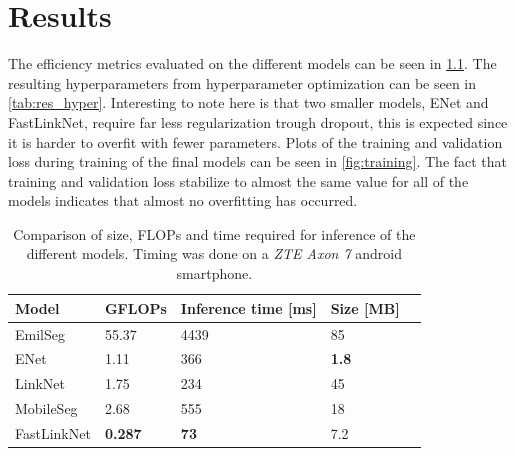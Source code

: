 \documentclass{kththesis}
\begin{document}
\chapter{Results}
The efficiency metrics evaluated on the different models can be seen in \cref{tab:res_resources}.
The resulting hyperparameters from hyperparameter optimization can be seen in
\cref{tab:res_hyper}. Interesting to note here is that two smaller models, ENet
and FastLinkNet, require far less regularization trough dropout, this is
expected since it is harder to overfit with fewer parameters.
Plots of the training and validation loss during training of the final models
can be seen in \cref{fig:training}. The fact that training and validation
loss stabilize to almost the same value for all of the models indicates that
almost no overfitting has occurred.

\begin{table}[]
\centering
\caption{Comparison of size, FLOPs and time required for inference of the
  different models. Timing was done on a \textit{ZTE Axon 7} android smartphone.}
\label{tab:res_resources}
\begin{tabular}{@{}lllll@{}}
\toprule
Model       &  GFLOPs  & Inference time {[}ms{]} & Size {[}MB{]}  \\ \midrule
EmilSeg     &  55.37   & 4439                    & 85             \\
  ENet        &  1.11    & 366                     & \textbf{1.8}            \\
LinkNet     &  1.75    & 234                     & 45             \\
MobileSeg   &  2.68    & 555                     & 18             \\
FastLinkNet &  \textbf{0.287}   & \textbf{73}                      & 7.2            \\ \bottomrule
\end{tabular}
\end{table}
\end{document}
